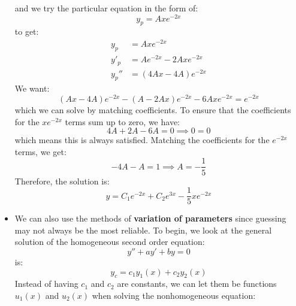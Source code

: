 \begin{itemize}
\begin{example}
\begin{equation}
            \label{eq:}
        \end{equation}
        and we try the particular equation in the form of:
        \begin{equation}
            y_p=Axe^{-2x}
            \label{eq:}
        \end{equation}
        to get:
        \begin{align}
            y_p &= Axe^{-2x} \\ 
            y'_p &= Ae^{-2x}-2Axe^{-2x} \\ 
            y_p'' &= (4Ax-4A)e^{-2x}
        \end{align}
        We want:
        \begin{equation}
            (Ax-4A)e^{-2x}-(A-2Ax)e^{-2x}-6Axe^{-2x}=e^{-2x}
            \label{eq:}
        \end{equation}
        which we can solve by matching coefficients. To ensure that the coefficients for the $xe^{-2x}$ terms sum up to zero, we have:
        \begin{equation}
            4A+2A-6A=0 \implies 0=0
            \label{eq:}
        \end{equation}
        which means this is always satisfied. Matching the coefficients for the $e^{-2x}$ terms, we get:
        \begin{equation}
            -4A-A=1 \implies A=-\frac{1}{5}
            \label{eq:}
        \end{equation}
        Therefore, the solution is:
        \begin{equation}
            y = C_1e^{-2x} + C_2e^{3x} - \frac{1}{5}xe^{-2x}
            \label{eq:}
        \end{equation}
    \end{example}
    \item We can also use the methods of \textbf{variation of parameters} since guessing may not always be the most reliable. To begin, we look at the general solution of the homogeneous second order equation:
    \begin{equation}
        y''+ay'+by = 0
        \label{eq:}
    \end{equation}
    is:
    \begin{equation}
        y_c = c_1y_1(x) + c_2y_2(x)
        \label{eq:}
    \end{equation}
    Instead of having $c_1$ and $c_2$ are constants, we can let them be functions $u_1(x)$ and $u_2(x)$ when solving the nonhomogeneous equation:
    \begin{equation}

\end{equation}
\end{itemize}

